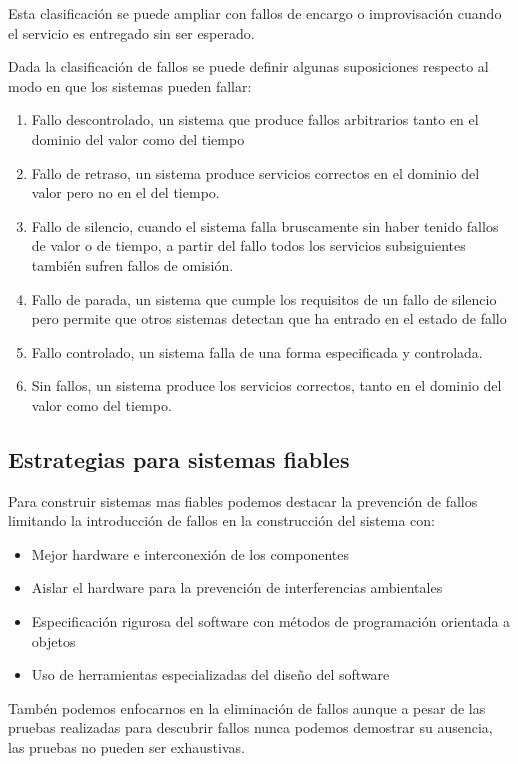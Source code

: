 Esta clasificación se puede ampliar con fallos de encargo o improvisación cuando
el servicio es entregado sin ser esperado.

Dada la clasificación de fallos se puede definir algunas suposiciones respecto
al modo en que los sistemas pueden fallar:

\begin{enumerate}
	\item Fallo descontrolado, un sistema que produce fallos arbitrarios
		tanto en el dominio del valor como del tiempo
	\item Fallo de retraso, un sistema produce servicios correctos en el
		dominio del valor pero no en el del tiempo.
	\item Fallo de silencio, cuando el sistema falla bruscamente sin haber
		tenido fallos de valor o de tiempo, a partir del fallo todos los
		servicios subsiguientes también sufren fallos de omisión.
	\item Fallo de parada, un sistema que cumple los requisitos de un fallo
		de silencio pero permite que otros sistemas detectan que ha
		entrado en el estado de fallo
	\item Fallo controlado, un sistema falla de una forma especificada y
		controlada.
	\item Sin fallos, un sistema produce los servicios correctos, tanto en
		el dominio del valor como del tiempo.
\end{enumerate}

\subsection{Estrategias para sistemas fiables}

Para construir sistemas mas fiables podemos destacar la prevención de fallos
limitando la introducción de fallos en la construcción del sistema con:

\begin{itemize}
	\item Mejor hardware e interconexión de los componentes
	\item Aislar el hardware para la prevención de interferencias
		ambientales
	\item Especificación rigurosa del software con métodos de programación
		orientada a objetos
	\item Uso de herramientas especializadas del diseño del software
\end{itemize}

Tambén podemos enfocarnos en la eliminación de fallos aunque a pesar de las
pruebas realizadas para descubrir fallos nunca podemos demostrar su ausencia,
las pruebas no pueden ser exhaustivas.

